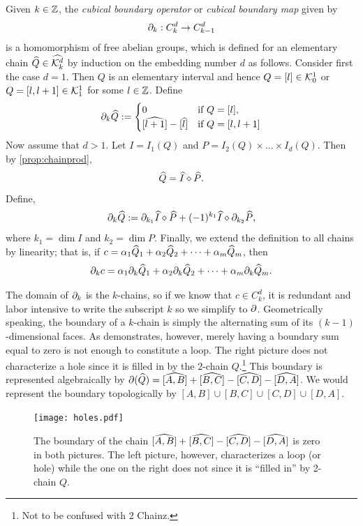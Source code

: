 \begin{defn} \label{defn:bdop}
	Given $k \in \mathbb{Z}$, the \textit{cubical boundary operator} or \textit{cubical boundary map} given by
	$$ \partial_k : C_k^d \rightarrow C_{k-1}^d $$
	is a homomorphism of free abelian groups, which is defined for an elementary chain $\widehat{Q} \in \widehat{\mathcal{K}^{d}_k}$ by induction on the embedding number $d$ as follows. Consider first the case $d = 1$. Then $Q$ is an elementary interval and hence $Q = [l] \in \mathcal{K}_0^1$ or $Q = [l, l+1] \in \mathcal{K}_1^1$ for some $l \in \mathbb{Z}$. Define
		$$ \del_k \Qhat :=
			\begin{cases}
				0	& \text{if } Q = [l], \\
				[ \wh{l+1} ] - [\wh{l}]	& \text{if } Q = [l, l+1]
			\end{cases}$$
	Now assume that $d > 1$. Let $I = I_1(Q)$ and $P = I_2(Q) \times \ldots \times I_d(Q)$. Then by \ref{prop:chainprod},
	$$ \widehat{Q} = \widehat{I} \diamond \widehat{P}. $$
	Define,
	$$\partial_k \widehat{Q} := \partial_{k_1} \widehat{I} \diamond \widehat{P} + (-1)^{k_1} \widehat{I} \diamond \partial_{k_2} \widehat{P}, $$
	where $k_1 = \dim{I}$ and $k_2 = \dim{P}$. Finally, we extend the definition to all chains by linearity; that is, if $c = \alpha_1 \widehat{Q}_1 + \alpha_2 \widehat{Q}_2 + \cdots + \alpha_m \widehat{Q}_m$, then
	$$ \partial_k c = \alpha_1 \partial_k \widehat{Q}_1 + \alpha_2 \partial_k \widehat{Q}_2 + \cdots + \alpha_m \partial_k \widehat{Q}_m. $$
\end{defn}

The domain of $\partial_k$ is the $k$-chains, so if we know that $c \in C_k^d$, it is redundant and labor intensive to write the subscript $k$ so we simplify to $\partial$. Geometrically speaking, the boundary of a $k$-chain is simply the alternating sum of its $(k-1)$-dimensional faces. As  demonstrates, however, merely having a boundary sum equal to zero is not enough to constitute a loop. The right picture does not characterize a hole since it is filled in by the 2-chain $Q$.\footnote{Not to be confused with 2 Chainz.} This boundary is represented algebraically by $\partial (\widehat{Q}) = [\widehat{A, B}] + [\widehat{B, C}] - [\widehat{C, D}] - [\widehat{D, A}]$. We would represent the boundary topologically by $[A, B] \cup [B, C] \cup [C, D] \cup [D, A]$.

\begin{figure}[h]
\begin{center}
\texttt{[image: holes.pdf]}
\caption{\label{fig:holes} The boundary of the chain $[\widehat{A, B}] + [\widehat{B, C}] - [\widehat{C, D}] - [\widehat{D, A}]$ is zero in both pictures. The left picture, however, characterizes a loop (or hole) while the one on the right does not since it is ``filled in'' by 2-chain $Q$. }
\end{center}
\end{figure}

